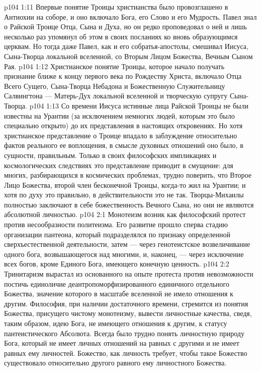 \vs p104 1:11 Впервые понятие Троицы христианства было провозглашено в Антиохии на соборе, и оно включало Бога, его Слово и его Мудрость. Павел знал о Райской Троице Отца, Сына и Духа, но он редко проповедовал о ней и лишь несколько раз упомянул об этом в своих посланиях ко вновь образующимся церквам. Но тогда даже Павел, как и его собратья\hyp{}апостолы, смешивал Иисуса, Сына\hyp{}Творца локальной вселенной, со Вторым Лицом Божества, Вечным Сыном Рая.
\vs p104 1:12 Христианское понятие Троицы, которое начало получать признание ближе к концу первого века по Рождеству Христа, включало Отца Всего Сущего, Сына\hyp{}Творца Небадона и Божественную Служительницу Салвингтона --- Матерь\hyp{}Дух локальной вселенной и творческую супругу Сына\hyp{}Творца.
\vs p104 1:13 Со времени Иисуса истинные лица Райской Троицы не были известны на Урантии (за исключением немногих людей, которым это было специально открыто) до их представления в настоящих откровениях. Но хотя христианское представление о Троице впадало в заблуждение относительно фактов реального ее воплощения, в смысле духовных отношений оно было, в сущности, правильным. Только в своих философских импликациях и космологических следствиях это представление приводит в смущение: для многих, разбирающихся в космических проблемах, трудно поверить, что Второе Лицо Божества, второй член бесконечной Троицы, когда\hyp{}то жил на Урантии; и хотя по духу это правильно, в действительности это не так. Творцы\hyp{}Михаилы полностью заключают в себе божественность Вечного Сына, но они не являются абсолютной личностью.
\vs p104 2:1 Монотеизм возник как философский протест против несообразности политеизма. Его развитие прошло сперва стадию организации пантеона, который подразделялся по признаку определенной сверхъестественной деятельности, затем --- через генотеистское возвеличивание одного бога, возвышающегося над многими, и, наконец, --- через исключение всех богов, кроме Единого Бога, имеющего конечную ценность.
\vs p104 2:2 Тринитаризм вырастал из основанного на опыте протеста против невозможности постичь единоличие деантропоморфизированного единичного отдельного Божества, значение которого в масштабе вселенной не имело отношения к другим. Философия, при наличии достаточного времени, стремится из понятия Божества, присущего чистому монотеизму, вывести личностные качества, сведя, таким образом, идею Бога, не имеющего отношения к другим, к статусу пантеистического Абсолюта. Всегда было трудно понять личностную природу Бога, который не имеет личных отношений на равных с другими и не имеет равных ему личностей. Божество, как личность требует, чтобы такое Божество существовало относительно другого равного ему личностного Божества.
